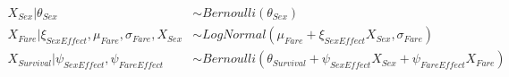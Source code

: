 \documentclass[12pt]{article}
\begin{document}
$$
\begin{aligned}
X_{Sex} |\theta_{Sex} &\sim Bernoulli(\theta_{Sex}) \\[8pt]
X_{Fare} | \xi_{SexEffect}, \mu_{Fare}, \sigma_{Fare}, X_{Sex} &\sim LogNormal(\mu_{Fare} + \xi_{SexEffect} X_{Sex}, \sigma_{Fare}) \\[8pt]
X_{Survival} | \psi_{SexEffect}, \psi_{FareEffect} &\sim Bernoulli(\theta_{Survival} + \psi_{SexEffect} X_{Sex} + \psi_{FareEffect} X_{Fare})
\end{aligned}
$$
\end{document}
